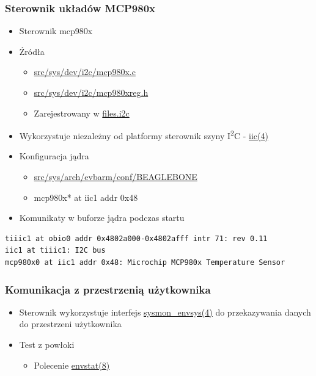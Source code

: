 \documentclass[dvipsnames,table]{beamer}
\begin{document}
\begin{frame}[fragile]
\frametitle{Sterownik układów MCP980x}
\begin{itemize}
	\item Sterownik mcp980x
	\item Źródła
	\begin{itemize}
		\item \href{http://nxr.netbsd.org/xref/src/sys/dev/i2c/mcp980x.c}{src/sys/dev/i2c/mcp980x.c}
		\item \href{http://nxr.netbsd.org/xref/src/sys/dev/i2c/mcp980xreg.h}{src/sys/dev/i2c/mcp980xreg.h}
		\item Zarejestrowany w \href{http://nxr.netbsd.org/xref/src/sys/dev/i2c/files.i2c}{files.i2c}
	\end{itemize}
	\item Wykorzystuje niezależny od platformy sterownik szyny I\textsuperscript{2}C - \href{http://netbsd.gw.com/cgi-bin/man-cgi?iic+9+NetBSD-current}{iic(4)}
	\item Konfiguracja jądra
	\begin{itemize}
		\item \href{http://nxr.netbsd.org/xref/src/sys/arch/evbarm/conf/BEAGLEBONE}{src/sys/arch/evbarm/conf/BEAGLEBONE}
		\item mcp980x* at iic1 addr 0x48
	\end{itemize}
	\item Komunikaty w buforze jądra podczas startu
\end{itemize}
\scriptsize
\begin{verbatim}
tiiic1 at obio0 addr 0x4802a000-0x4802afff intr 71: rev 0.11
iic1 at tiiic1: I2C bus
mcp980x0 at iic1 addr 0x48: Microchip MCP980x Temperature Sensor
\end{verbatim}
\end{frame}

\begin{frame}
\frametitle{Komunikacja z przestrzenią użytkownika}
\begin{itemize}
	\item Sterownik wykorzystuje interfejs \href{http://netbsd.gw.com/cgi-bin/man-cgi?sysmon_envsys+9+NetBSD-current}{sysmon\_envsys(4)} do przekazywania danych do przestrzeni użytkownika
	\item Test z powłoki
	\begin{itemize}
		\item Polecenie \href{http://netbsd.gw.com/cgi-bin/man-cgi?envstat+8+NetBSD-current}{envstat(8)}
	\end{itemize}
\end{itemize}
\end{frame}
\end{document}
